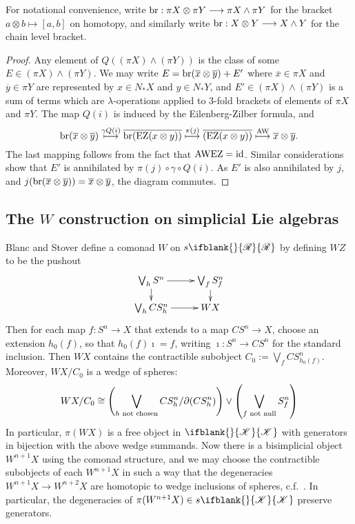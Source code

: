 \documentclass[10pt]{article}
\newcommand{\PRLie}[1]%
{\ifblank{#1}{\scrR}{\scrR^{#1}}}
\newcommand{\LL}[1]{\ifblank{#1}{\scrK}{\scrK^{#1}}}
\begin{document}
\begin{Grothendieck Multiplicativity}
For notational convenience, write $\textup{br}:\pi X\otimes \pi Y\to \pi X\wedge \pi Y$ for the bracket $a\otimes b\mapsto [a,b]$ on homotopy, and similarly write $\textup{br}:X\otimes Y\to X\wedge Y$ for the chain level bracket.

\begin{proof}
Any element of $Q((\pi X)\wedge (\pi Y))$ is the class of some $E\in (\pi X)\wedge (\pi Y)$. We may write $E=\textup{br}(\overline{x}\otimes\overline{y})+E'$ where $\overline{x}\in\pi X$ and $\overline{y}\in\pi Y$ are represented by $x\in N_*X$ and $y\in N_*Y$, and $E'\in(\pi X)\wedge (\pi Y)$ is a sum of terms which are $\lambda$-operations applied to 3-fold brackets of elements of $\pi X$ and $\pi Y$. The map $Q(i)$ is induced by the Eilenberg-Zilber formula, and
\[\textup{br}(\overline{x}\otimes\overline{y})\overset{\gamma\circ Q(i)}{\mapsto}\overline{\textup{br}(\textup{EZ}(x\otimes y))}\overset{\pi(j)}{\mapsto}\overline{(\textup{EZ}(x\otimes y))}\overset{\textup{AW}}{\mapsto}\overline{x}\otimes \overline{y}.\]
The last mapping follows from the fact that $\textup{AW}\circ\textup{EZ}=\textup{id}$.
Similar considerations show that $E'$ is annihilated by $\pi(j)\circ\gamma\circ Q(i)$. As $E'$ is also annihilated by $j$, and $j(\textup{br}(\overline{x}\otimes\overline{y})) =\overline{x}\otimes\overline{y}$, the diagram commutes.
\end{proof}
\subsection{The $W$ construction on simplicial Lie algebras}
Blanc and Stover \cite{Blanc_Stover-Groth_SS.pdf} define a comonad $W$ on $s\PRLie{}$ by defining $WZ$ to be the pushout
\[\xymatrix@R=4mm{
\bigvee_{h}S^n
\ar[r]\ar[d]
&%
\bigvee_{f}S^n_f\ar[d]\\%
\bigvee_{h}CS^n_h
\ar[r]&%
WX%
}\]
Then for each map $f:S^n\to X$ that extends to a map $CS^n\to X$, choose an extension $h_0(f)$, so that $h_0(f)\imath=f$, writing $\imath:S^n\to CS^n$ for the standard inclusion. Then $WX$ contains the contractible subobject $C_0:=\bigvee_f CS^n_{h_0(f)}$. Moreover, $WX/C_0$ is a wedge of spheres:
\[WX/C_0\cong \left(\bigvee_{h\textup{ not chosen}}CS^n_h/\partial(CS^n_h)\right) \vee\left(\bigvee_{f\textup{ not null}}S^n_f\right)\]
In particular, $\pi(WX)$ is a free object in $\LL{}$ with generators in bijection with the above wedge summands. Now there is a bisimplicial object $W^{n+1}X$ using the comonad structure, and we may choose the contractible subobjects of each $W^{n+1}X$ in such a way that the degeneracies $W^{n+1}X\to W^{n+2}X$ are homotopic to wedge inclusions of spheres, c.f.\ \cite{StoverVanKampen.pdf}. In particular, the degeneracies of $\pi(W^{n+1}X)\in s\LL{}$ preserve generators.


\end{Grothendieck Multiplicativity}
\end{document}
